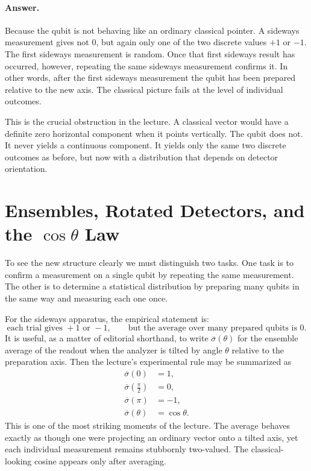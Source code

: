 \paragraph{Answer.} Because the qubit is not behaving like an ordinary classical pointer. A sideways measurement gives not \(0\), but again only one of the two discrete values \(+1\) or \(-1\). The first sideways measurement is random. Once that first sideways result has occurred, however, repeating the same sideways measurement confirms it. In other words, after the first sideways measurement the qubit has been prepared relative to the new axis. The classical picture fails at the level of individual outcomes.

This is the crucial obstruction in the lecture. A classical vector would have a definite zero horizontal component when it points vertically. The qubit does not. It never yields a continuous component. It yields only the same two discrete outcomes as before, but now with a distribution that depends on detector orientation.

\section{Ensembles, Rotated Detectors, and the \(\cos\theta\) Law}

To see the new structure clearly we must distinguish two tasks. One task is to confirm a measurement on a single qubit by repeating the same measurement. The other is to determine a statistical distribution by preparing many qubits in the same way and measuring each one once.

For the sideways apparatus, the empirical statement is:
\begin{equation}
\text{each trial gives }+1\text{ or }-1,\qquad \text{but the average over many prepared qubits is }0.
\end{equation}
It is useful, as a matter of editorial shorthand, to write \(\overline{\sigma}(\theta)\) for the ensemble average of the readout when the analyzer is tilted by angle \(\theta\) relative to the preparation axis. Then the lecture's experimental rule may be summarized as
\begin{align}
\overline{\sigma}(0) &= 1,\\
\overline{\sigma}\!\left(\frac{\pi}{2}\right) &= 0,\\
\overline{\sigma}(\pi) &= -1,\\
\overline{\sigma}(\theta) &= \cos\theta.
\end{align}
This is one of the most striking moments of the lecture. The average behaves exactly as though one were projecting an ordinary vector onto a tilted axis, yet each individual measurement remains stubbornly two-valued. The classical-looking cosine appears only after averaging.

